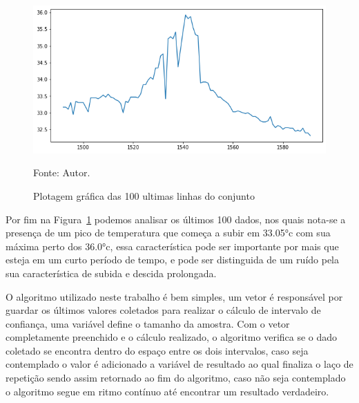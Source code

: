 \begin{figure}[H]
	\centering
	\includegraphics[width=15cm]{imagens/sensores/bruto_100_ultimas.png}
	\caption{Plotagem gráfica das 100 ultimas linhas do conjunto}
	Fonte: Autor.
	\label{fig: bruto_100u}
\end{figure}

Por fim na Figura~\ref{fig: bruto_100u} podemos analisar os últimos 100 dados, nos quais nota-se a presença de um pico de temperatura que começa a subir em \ang{33.05}c com sua máxima perto dos \ang{36.0}c, essa característica pode ser importante por mais que esteja em um curto período de tempo, e pode ser distinguida de um ruído pela sua característica de subida e descida prolongada. 

O algoritmo utilizado neste trabalho é bem simples, um vetor é responsável por guardar os últimos valores coletados para realizar o cálculo de intervalo de confiança, uma variável define o tamanho da amostra. Com o vetor completamente preenchido e o cálculo realizado, o algoritmo verifica se o dado coletado se encontra dentro do espaço entre os dois intervalos, caso seja contemplado o valor é adicionado a variável de resultado ao qual finaliza o laço de repetição sendo assim retornado ao fim do algoritmo, caso não seja contemplado o algoritmo segue em ritmo contínuo até encontrar um resultado verdadeiro.

